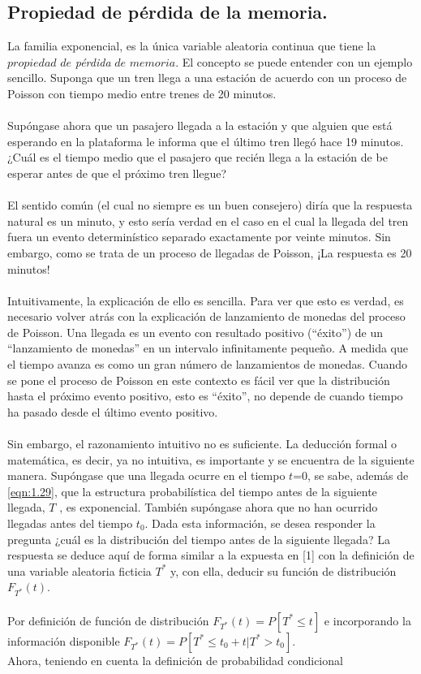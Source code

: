 \subsection{Propiedad de pérdida de la memoria.}
La familia exponencial, es la única variable aleatoria continua que tiene la $propiedad$ $de$ {\em pérdida} $de$ $memoria.$ El concepto se puede entender con un ejemplo sencillo. Suponga que un tren llega a una estación de acuerdo con un proceso de Poisson con tiempo medio entre trenes de 20 minutos.
\\\\
Supóngase ahora que un pasajero llegada a la estación y que alguien que está esperando en la plataforma le informa que el último tren llegó hace 19 minutos. ¿Cuál es el tiempo medio que el pasajero que recién llega a la estación de be esperar antes de que el próximo tren llegue?
\\\\
El sentido común (el cual no siempre es un buen consejero) diría que la respuesta natural es un minuto, y esto sería verdad en el caso en el cual la llegada del tren fuera un evento determinístico separado exactamente por veinte minutos. Sin embargo, como se trata de un proceso de llegadas de
Poisson, ¡La respuesta es 20 minutos!
\\\\
Intuitivamente, la explicación de ello es sencilla. Para ver que esto es verdad, es necesario volver atrás con la explicación de lanzamiento de monedas del proceso de Poisson. Una llegada es un evento con resultado positivo (“éxito”) de un “lanzamiento de monedas” en un intervalo infinitamente pequeño. A medida que el tiempo avanza es como un gran número de lanzamientos de monedas. Cuando se pone el proceso de Poisson en este contexto es fácil ver que la distribución hasta el próximo evento positivo, esto es “éxito”, no depende de cuando tiempo ha pasado desde el último evento positivo.
\\\\
Sin embargo, el razonamiento intuitivo no es suficiente. La deducción formal o matemática, es decir, ya no intuitiva, es importante y se encuentra de la siguiente manera. Supóngase que una llegada ocurre en el tiempo $t$=0, se sabe, además de \ref{eqn:1.29}, que la estructura probabilística del
tiempo antes de la siguiente llegada, $T$ , es exponencial. También supóngase ahora que no han ocurrido llegadas antes del tiempo $t_{0}$.
Dada esta información, se desea responder la pregunta ¿cuál
es la distribución del tiempo antes de la siguiente llegada? La respuesta se deduce aquí de forma similar a la expuesta en [1] con la definición de una variable aleatoria ficticia $T^{*}$ y, con ella, deducir su función de distribución $F_{T^{*}}\left ( t \right )$.
\\\\
Por definición de función de distribución $F_{T^{*}}\left ( t \right )=P\left [ T^{*}\leq t \right ]$ e incorporando la información disponible
$F_{T^{*}}\left ( t \right )=P\left [ T^{*}\leq t_{0}+t|T^{*}>t_{0} \right]$. 
\\
Ahora, teniendo en cuenta la definición de probabilidad condicional

